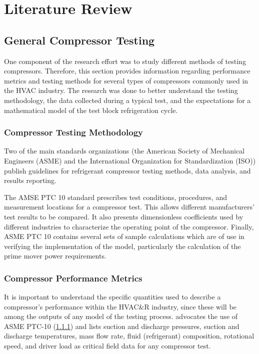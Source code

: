\chapter{Literature Review} \label{cha:litreview}

\section{General Compressor Testing} \label{sec:gencomp}
One component of the research effort was 
to study different methods of testing compressors. 
Therefore, this section provides information regarding performance metrics 
and testing methods for several types of compressors
commonly used in the HVAC industry. 
The research was done to better understand the testing methodology, 
the data collected during a typical test, 
and the expectations for a mathematical model of the test block refrigeration cycle.

\subsection{Compressor Testing Methodology} \label{sec:TestMethodology}
Two of the main standards organizations (the American Society of Mechanical Engineers (ASME) 
and the International Organization for Standardization (ISO)) 
publish guidelines for refrigerant compressor testing methods, data analysis, and results reporting.

The AMSE PTC 10 standard \citep{ptc10} prescribes test conditions, 
procedures, and measurement locations for a compressor test. 
This allows different manufacturers' test results to be compared. 
It also presents dimensionless coefficients used by different industries 
to characterize the operating point of the compressor. 
Finally, ASME PTC 10 contains several sets of sample calculations 
which are of use in verifying the implementation of the model, 
particularly the calculation of the prime mover power requirements.

\subsection{Compressor Performance Metrics}
It is important to understand the specific quantities used 
to describe a compressor's performance within the HVAC\&R%
industry, since these will be among the outputs of any model of the testing process. 
\citet{wilcox2007} advocates the use of ASME PTC-10 (\cref{sec:TestMethodology}) and lists
  suction and discharge pressures,
  suction and discharge temperatures,
  mass flow rate,
  fluid (refrigerant) composition,
  rotational speed, and
  driver load
as critical field data for any compressor test.

